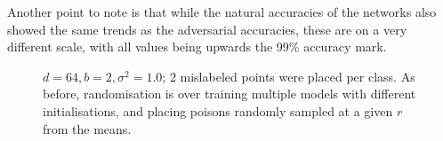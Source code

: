 \documentclass{ociamthesis}
\begin{document}
Another point to note is that while the natural accuracies of the networks also
showed the same trends as the adversarial accuracies, these are on a very
different scale, with all values being upwards the 99\% accuracy mark.

\begin{figure}[!h]
    \centering
    \qquad
    \caption{$d=64, b=2, \sigma^2=1.0$; $2$ mislabeled points were placed per
    class. As before, randomisation is over training multiple models with
    different initialisations, and placing poisons randomly sampled at a given
    $r$ from the means.}
    \label{fig:poison-toy-experiments}
\end{figure}
\end{document}
